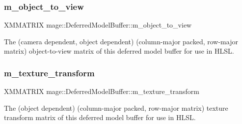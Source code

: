 \subsubsection{\texorpdfstring{m\+\_\+object\+\_\+to\+\_\+view}{m\_object\_to\_view}}
{\footnotesize\ttfamily X\+M\+M\+A\+T\+R\+IX mage\+::\+Deferred\+Model\+Buffer\+::m\+\_\+object\+\_\+to\+\_\+view}

The (camera dependent, object dependent) (column-\/major packed, row-\/major matrix) object-\/to-\/view matrix of this deferred model buffer for use in H\+L\+SL. \hypertarget{structmage_1_1_deferred_model_buffer_aff77294d91f1262c4447ef8b923276a1}{}\label{structmage_1_1_deferred_model_buffer_aff77294d91f1262c4447ef8b923276a1} 
\subsubsection{\texorpdfstring{m\+\_\+texture\+\_\+transform}{m\_texture\_transform}}
{\footnotesize\ttfamily X\+M\+M\+A\+T\+R\+IX mage\+::\+Deferred\+Model\+Buffer\+::m\+\_\+texture\+\_\+transform}

The (object dependent) (column-\/major packed, row-\/major matrix) texture transform matrix of this deferred model buffer for use in H\+L\+SL. 